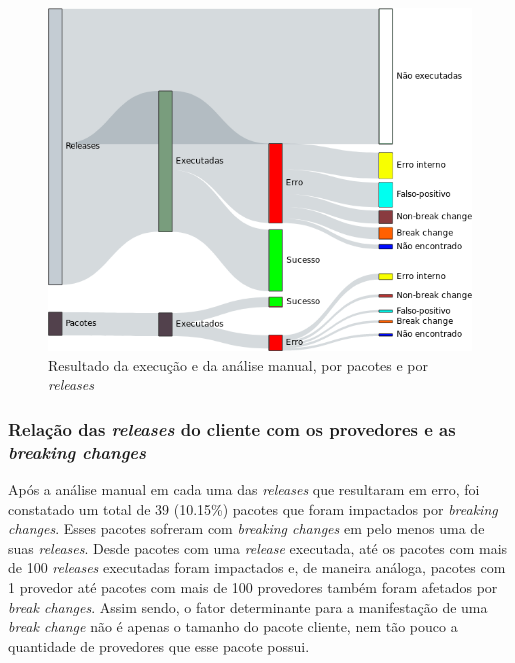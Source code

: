 \begin{figure}
    \centering
    \includegraphics[scale=0.4]{figuras/result_rq1_g.png}
    \caption{Resultado da execução e da análise manual, por pacotes e por \textit{releases}}
    \label{fig:res_rq1_g}
\end{figure}{}

\subsubsection{Relação das \textit{releases} do cliente com os provedores e as \textit{breaking changes}}

Após a análise manual em cada uma das \textit{releases} que resultaram em erro, foi constatado um total de 39 (10.15\%) pacotes que foram impactados por \textit{breaking changes}.  Esses pacotes sofreram com \textit{breaking changes} em pelo menos uma de suas \textit{releases}. Desde pacotes com uma \textit{release} executada, até os pacotes com mais de 100 \textit{releases} executadas foram impactados e, de maneira análoga, pacotes com 1 provedor até pacotes com mais de 100 provedores também foram afetados por \textit{break changes}.  Assim sendo, o fator determinante para a manifestação de uma \textit{break change} não é apenas o tamanho do pacote cliente, nem tão pouco a quantidade de provedores que esse pacote possui. 

